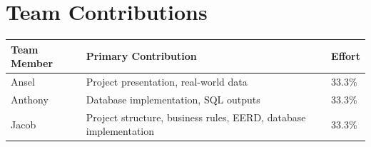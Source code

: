 \section{Team Contributions}

\begin{center}
\begin{tabular}{|l|l|l|}
\hline
\textbf{Team Member} & \textbf{Primary Contribution} & \textbf{Effort} \\
\hline
Ansel & Project presentation, real-world data & 33.3\% \\
\hline
Anthony & Database implementation, SQL outputs & 33.3\% \\
\hline
Jacob & Project structure, business rules, EERD, database implementation & 33.3\% \\
\hline
\end{tabular}
\end{center}
